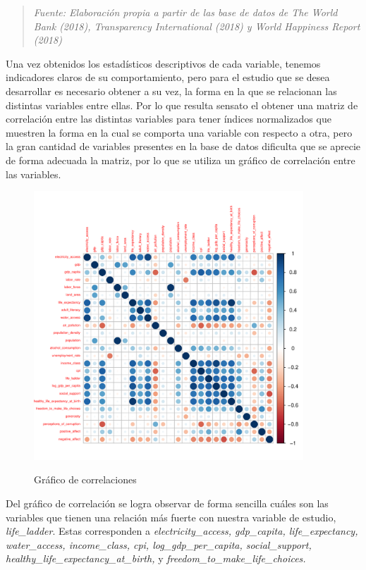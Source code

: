 \begin{quote}
    \textit{Fuente: Elaboración propia a partir de las base de datos de The World Bank (2018), Transparency International (2018) y World Happiness Report (2018)}\\
\end{quote}


Una vez obtenidos los estadísticos descriptivos de cada variable, tenemos indicadores claros de su comportamiento, pero para el estudio que se desea desarrollar es necesario obtener a su vez, la forma en la que se relacionan las distintas variables entre ellas. Por lo que resulta sensato el obtener una matriz de correlación entre las distintas variables para tener índices normalizados que muestren la forma en la cual se comporta una variable con respecto a otra, pero la gran cantidad de variables presentes en la base de datos dificulta que se aprecie de forma adecuada la matriz, por lo que se utiliza un gráfico de correlación entre las variables.

\pagebreak

\begin{figure}[!ht]
    \centering
    \caption{Gráfico de correlaciones}
    \includegraphics[width=0.9\textwidth]{figures/correlaciones.pdf}
    \label{fig:correlaciones}
\end{figure}

Del gráfico de correlación se logra observar de forma sencilla cuáles son las variables que tienen una relación más fuerte con nuestra variable de estudio, \textit{life\_ladder}. Estas corresponden a \textit{electricity\_access, gdp\_capita, life\_expectancy, water\_access, income\_class, cpi, log\_gdp\_per\_capita, social\_support, healthy\_life\_expectancy\_at\_birth,} y \textit{freedom\_to\_make\_life\_choices.}

